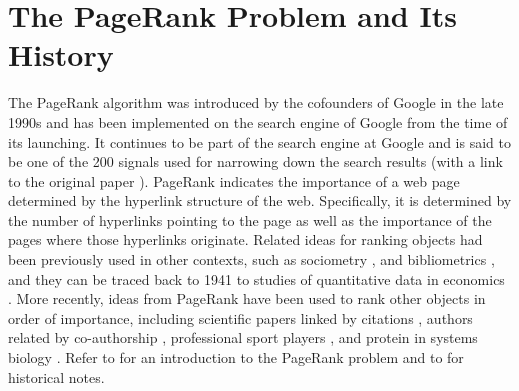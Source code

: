 \documentclass[11pt,draftcls,onecolumn]{IEEEtran}
\begin{document}
\newpage
\section*{The PageRank Problem and Its History}

The PageRank algorithm was introduced by the cofounders of Google 
in the late 1990s \cite{BriPag:98} and has been implemented on the search engine of Google
from the time of its launching. 
It continues to be part of the search engine at Google and is said to be
one of the 200 signals used for narrowing down the search results \cite{google:13}
(with a link to the original paper \cite{BriPag:98}).
PageRank indicates the importance of a web page determined by the hyperlink structure 
of the web. Specifically, it is determined by the number of hyperlinks pointing to 
the page as well as the importance of the pages where those hyperlinks originate.
Related ideas for ranking objects had been previously used in other contexts, 
such as sociometry \cite{Hubbell:65}, and bibliometrics \cite{PinNar:76},
and they can be traced back to 1941 
to studies of quantitative data in economics \cite{Leontief:41}.
More recently, ideas from PageRank have been used to rank other objects in order of importance, including scientific papers linked by citations \cite{CXMR:09}, authors related by co-authorship 
\cite{LiBoNede:05}, professional sport players 
\cite{Radicchi:11}, and protein in systems biology \cite{ZaBeEf:12}. 
Refer to \cite{LanMey:06} for an introduction to the PageRank problem and to
\cite{Franceschet:11} for historical notes.
\end{document}
